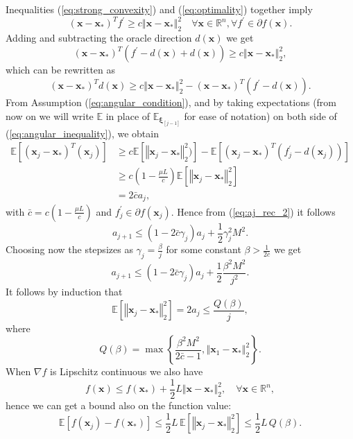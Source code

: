 \documentclass{article}
\renewcommand{\vec}[1]{\boldsymbol{#1}}
\newcommand{\norm}[1]{\left\Vert #1 \right\Vert}
\begin{document}
Inequalities (\ref{eq:strong_convexity}) and (\ref{eq:optimality}) together imply
\begin{equation}
	(\vec{x}-\vec{x}_*)^T f^\prime \geq c \norm{\vec{x}-\vec{x}_*}^2_2 \quad \forall \vec{x} \in \mathbb{R}^n, \forall f^\prime\in\partial f(\vec{x}).
\end{equation}
Adding and subtracting the oracle direction $d(\vec{x})$ we get
\begin{equation}
	(\vec{x}-\vec{x}_*)^T (f^\prime -d(\vec{x}) +d(\vec{x})) \geq c \norm{\vec{x}-\vec{x}_*}^2_2,
\end{equation}
which can be rewritten as
\begin{equation}
		(\vec{x}-\vec{x}_*)^T d(\vec{x}) \geq c \norm{\vec{x}-\vec{x}_*}^2_2 - (\vec{x}-\vec{x}_*)^T (f^\prime -d(\vec{x})).
		\label{eq:angular_inequality}
\end{equation}
From Assumption (\ref{eq:angular_condition}), and by taking expectations (from now on we will write $\mathbb{E}$ in place of $\mathbb{E}_{\vec{\xi}_{[j-1]}}$ for ease of notation) on both side of (\ref{eq:angular_inequality}), we obtain
\begin{align}
\mathbb{E}[(\vec{x}_j-\vec{x}_*)^T (\vec{x}_j)] &\geq c \mathbb{E}[\norm{\vec{x}_j-\vec{x}_*}^2_2)] - \mathbb{E}[(\vec{x}_j-\vec{x}_*)^T (f_j^\prime -d(\vec{x}_j))]\\
 &\geq c\left(1-\frac{\mu L}{c}\right) \mathbb{E}[\norm{\vec{x}_j-\vec{x}_*}^2_2]\\
 & = 2\bar{c}a_j,
\end{align}
with $\bar{c}=c(1-\frac{\mu L }{c})$ and $f_j^\prime \in \partial f(\vec{x}_j)$.
Hence from (\ref{eq:aj_rec_2}) it follows 
\begin{equation}
	a_{j+1} \leq (1-2\bar{c}\gamma_j)a_j + \frac{1}{2}\gamma_j^2M^2.
\end{equation}
Choosing now the stepsizes as $\gamma_j = \frac{\beta}{j}$ for some constant $\beta>\frac{1}{2\bar{c}}$ we get
\begin{equation}
		a_{j+1} \leq (1-2\bar{c}\gamma_j)a_j + \frac{1}{2}\frac{\beta^2M^2}{j^2}.
\end{equation}
It follows by induction that
\begin{equation}
	\mathbb{E}[\norm{\vec{x}_j - \vec{x}_*}^2_2] = 2a_j\leq \frac{Q(\beta)}{j},
\end{equation}
where 
\begin{equation}
	Q(\beta) = \max\left\{\frac{\beta^2M^2}{2\bar{c}-1},\norm{\vec{x}_1 - \vec{x}_*}^2_2 \right\}.
\end{equation}
When $\nabla f$ is Lipschitz continuous we also have
\begin{equation}
	f(\vec{x})\leq f(\vec{x}_*) + \frac{1}{2}L\norm{\vec{x} - \vec{x}_*}^2_2, \quad \forall \vec{x} \in \mathbb{R}^n,
\end{equation}
hence we can get a bound also on the function value:
\begin{equation}
	\mathbb{E}[f(\vec{x}_j)-f(\vec{x}_*)] \leq \frac{1}{2} L\, \mathbb{E}[\norm{\vec{x}_j - \vec{x}_*}^2_2] \leq \frac{1}{2}L\,Q(\beta).
\end{equation}
\end{document}
